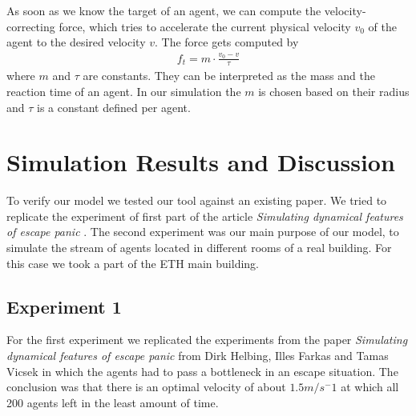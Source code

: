 \documentclass[11pt]{article}
\begin{document}
\begin{itemize}
	As soon as we know the target of an agent, we can compute the velocity-correcting force, which tries to accelerate the current physical velocity $v_0$ of the agent to the desired velocity $v$. The force gets computed by    
	\begin{align*}
	  f_t = m \cdot \frac{v_0-v}{\tau}
	\end{align*}
	where $m$ and $\tau$ are constants. They can be interpreted as the mass and the reaction time of an agent. In our simulation the $m$ is chosen based on their radius and $\tau$ is a constant defined per agent.
    
\end{itemize}

\section{Simulation Results and Discussion}
To verify our model we tested our tool against an existing paper. We tried to replicate the experiment of first part of the article \textit{Simulating dynamical features of escape panic} \cite{Helbing}. The second experiment was our main purpose of our model, to simulate the stream of agents located in different rooms of a real building. For this case we took a part of the ETH main building.

\subsection{Experiment 1}

For the first experiment we replicated the experiments from the paper \textit{Simulating dynamical features of escape panic} from Dirk Helbing, Illes Farkas and Tamas Vicsek in which the agents had to pass a bottleneck in an escape situation. The conclusion was that there is an optimal velocity of about $1.5 m/s^-1$ at which all 200 agents left in the least amount of time.
\end{document}
